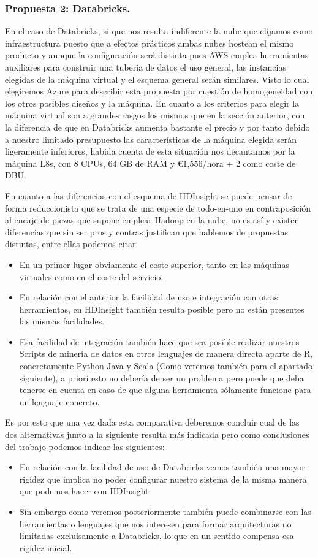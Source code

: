 \documentclass[11pt, a4paper]{article} %
\begin{document}
\subsubsection{Propuesta 2: Databricks.}
En el caso de Databricks, si que nos resulta indiferente la nube que elijamos como infraestructura puesto que a efectos prácticos ambas nubes hostean el mismo producto y aunque la configuración será distinta pues AWS emplea herramientas auxiliares para construir una tubería de datos el uso general, las instancias elegidas de la máquina virtual y el esquema general serán similares. Visto lo cual elegiremos Azure para describir esta propuesta por cuestión de homogeneidad con los otros posibles diseños y la máquina. En cuanto a los criterios para elegir la máquina virtual son a grandes rasgos los mismos que en la sección anterior, con la diferencia de que en Databricks aumenta bastante el precio y por tanto debido a nuestro limitado presupuesto las características de la máquina elegida serán ligeramente inferiores, habida cuenta de esta situación nos decantamos por la máquina L8s, con 8 CPUs, 64 GB de RAM y €1,556/hora + 2 como coste de DBU. \cite{docazure}


En cuanto a las diferencias con el esquema de HDInsight se puede pensar de forma reduccionista que se trata de una especie de todo-en-uno en contraposición al encaje de piezas que supone emplear Hadoop en la nube, no es así y existen diferencias que sin ser pros y contras justifican que hablemos de propuestas distintas, entre ellas podemos citar: 
\begin{itemize}
\item En un primer lugar obviamente el coste superior, tanto en las máquinas virtuales como en el coste del servicio.
\item En relación con el anterior la facilidad de uso e integración con otras herramientas, en HDInsight también resulta posible pero no están presentes las mismas facilidades.
\item Esa facilidad de integración también hace que sea posible realizar nuestros Scripts de minería de datos en otros lenguajes de manera directa aparte de R, concretamente Python Java y Scala (Como veremos también para el apartado siguiente), a priori esto no debería de ser un problema pero puede que deba tenerse en cuenta en caso de que alguna herramienta sólamente funcione para un lenguaje concreto.
\end{itemize}


Es por esto que una vez dada esta comparativa deberemos concluir cual de las dos alternativas junto a la siguiente resulta más indicada pero como conclusiones del trabajo podemos indicar las siguientes:
\begin{itemize}
\item En relación con la facilidad de uso de Databricks vemos también una mayor rigidez que implica no poder configurar nuestro sistema de la misma manera que podemos hacer con HDInsight.
\item Sin embargo como veremos posteriormente también puede combinarse con las herramientas o lenguajes que nos interesen para formar arquitecturas no limitadas excluisamente a Databricks, lo que en un sentido compensa esa rigidez inicial.
\end{itemize}
\end{document}
